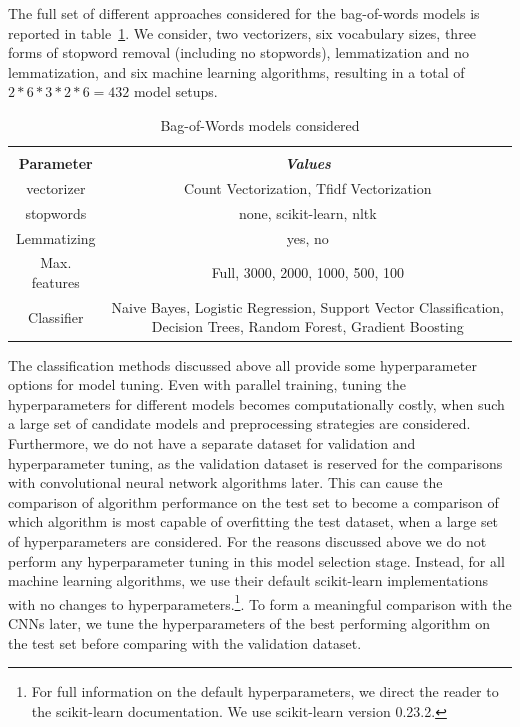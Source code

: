\documentclass[conference]{IEEEtran}
\begin{document}
The full set of different approaches considered for the bag-of-words models is reported in table~\ref{tababw}. We consider, two vectorizers, six vocabulary sizes, three forms of stopword removal (including no stopwords), lemmatization and no lemmatization, and six machine learning algorithms, resulting in a total of $2 * 6 * 3 * 2 * 6 = 432$ model setups.

\begin{table}[htbp]
\caption{Bag-of-Words models considered}
\begin{center}
\begin{tabular}{|c|c|}
\hline
\textbf{}&\multicolumn{1}{|c|}{\textbf{}} \\ 

\textbf{Parameter} & \textbf{\textit{Values}} \\ 
\hline
vectorizer & Count Vectorization, Tfidf Vectorization \\ 
\hline
stopwords & none, scikit-learn, nltk \\ 
\hline
Lemmatizing & yes, no \\ 
\hline
Max. features & Full, 3000, 2000, 1000, 500, 100 \\ 
\hline
Classifier & Naive Bayes, Logistic Regression, Support Vector Classification, Decision Trees, Random Forest, Gradient Boosting \\ 
\hline
\end{tabular}
\label{tababw}
\end{center}
\end{table}

The classification methods discussed above all provide some hyperparameter options for model tuning. Even with parallel training, tuning the hyperparameters for different models becomes computationally costly, when such a large set of candidate models and preprocessing strategies are considered. Furthermore, we do not have a separate dataset for validation and hyperparameter tuning, as the validation dataset is reserved for the comparisons with convolutional neural network algorithms later. This can cause the comparison of algorithm performance on the test set to become a comparison of which algorithm is most capable of overfitting the test dataset, when a large set of hyperparameters are considered. For the reasons discussed above we do not perform any hyperparameter tuning in this model selection stage. Instead, for all machine learning algorithms, we use their default scikit-learn implementations with no changes to hyperparameters.\footnote{For full information on the default hyperparameters, we direct the reader to the scikit-learn documentation\cite{scikit-learn}. We use scikit-learn version 0.23.2.}. To form a meaningful comparison with the CNNs later, we tune the hyperparameters of the best performing algorithm on the test set before comparing with the validation dataset.
\end{document}
